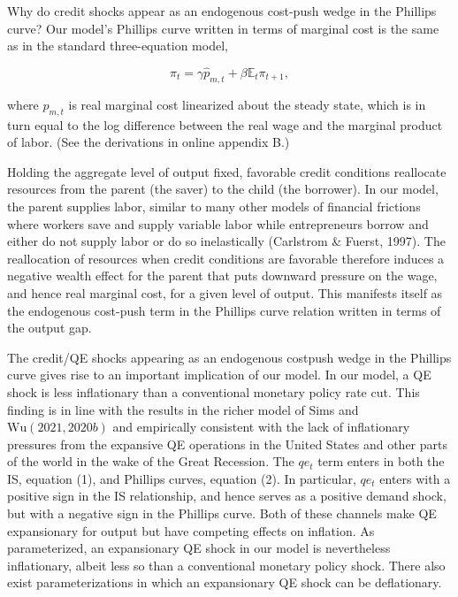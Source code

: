 \documentclass[10pt]{article}
\begin{document}
Why do credit shocks appear as an endogenous cost-push wedge in the Phillips curve? Our model's Phillips curve written in terms of marginal cost is the same as in the standard three-equation model,

\begin{equation*}
\pi_{t}=\gamma \widehat{p}_{m, t}+\beta \mathbb{E}_{t} \pi_{t+1}, \tag{38}
\end{equation*}

where $\widehat{p}_{m, t}$ is real marginal cost linearized about the steady state, which is in turn equal to the log difference between the real wage and the marginal product of labor. (See the derivations in online appendix B.)

Holding the aggregate level of output fixed, favorable credit conditions reallocate resources from the parent (the saver) to the child (the borrower). In our model, the parent supplies labor, similar to many other models of financial frictions where workers save and supply variable labor while entrepreneurs borrow and either do not supply labor or do so inelastically (Carlstrom \& Fuerst, 1997). The reallocation of resources when credit conditions are favorable therefore induces a negative wealth effect for the parent that puts downward pressure on the wage, and hence real marginal cost, for a given level of output. This manifests itself as the endogenous cost-push term in the Phillips curve relation written in terms of the output gap.

The credit/QE shocks appearing as an endogenous costpush wedge in the Phillips curve gives rise to an important implication of our model. In our model, a QE shock is less inflationary than a conventional monetary policy rate cut. This finding is in line with the results in the richer model of Sims and $\mathrm{Wu}(2021,2020 b)$ and empirically consistent with the lack of inflationary pressures from the expansive QE operations in the United States and other parts of the world in the wake of the Great Recession. The $q e_{t}$ term enters in both the IS, equation (1), and Phillips curves, equation (2). In particular, $q e_{t}$ enters with a positive sign in the IS relationship, and hence serves as a positive demand shock, but with a negative sign in the Phillips curve. Both of these channels make QE expansionary for output but have competing effects on inflation. As parameterized, an expansionary QE shock in our model is nevertheless inflationary, albeit less so than a conventional monetary policy shock. There also exist parameterizations in which an expansionary QE shock can be deflationary.
\end{document}
